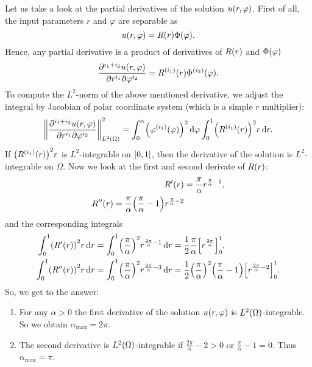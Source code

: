 \documentclass[english]{exercise}
\begin{document}
	Let us take a look at the partial derivatives of the solution \(u\parentheses*{r, \varphi}\).
	First of all, the input parameters \(r\) and \(\varphi\) are separable as
	\[
		u\parentheses*{r, \varphi} = R\parentheses*{r}\Phi\parentheses*{\varphi}.
	\]
	Hence, any partial derivative is a product of derivatives of \(R\parentheses*{r}\) and \(\Phi\parentheses*{\varphi}\)
	\[
		\frac{\partial^{i_1 + i_2}u\parentheses*{r, \varphi}}{\partial r^{i_1}\partial\varphi^{i_2}} = R^{\parentheses*{i_1}}\parentheses*{r}\Phi^{\parentheses*{i_2}}\parentheses*{\varphi}.
	\]
	To compute the \(L^2\)-norm of the above mentioned derivative, we adjust the integral by Jacobian of polar coordinate system (which is a simple \(r\) multiplier):
	\[
		\norm*{\frac{\partial^{i_1 + i_2}u\parentheses*{r, \varphi}}{\partial r^{i_1}\partial\varphi^{i_2}}}_{L^2\parentheses*{\Omega}}^2 = \int_0^\alpha \parentheses*{\varphi^{\parentheses*{i_2}}\parentheses*{\varphi}}^2 \d\varphi \int_0^1 \parentheses*{R^{\parentheses*{i_1}}\parentheses*{r}}^2 r\d r.
	\]
	If \(\parentheses*{R^{\parentheses*{i_1}}\parentheses*{r}}^2 r\) is \(L^2\)-integrable on \(\brackets*{0, 1}\), then the derivative of the solution is \(L^2\)-integrable on \(\Omega\).
	Now we look at the first and second derivate of \(R\parentheses*{r}\):
	\begin{align*}
		R'\parentheses*{r} &= \frac{\pi}{\alpha}r^{\frac{\pi}{\alpha} - 1},\\
		R''\parentheses*{r} = \frac{\pi}{\alpha}\parentheses*{\frac{\pi}{\alpha} - 1}r^{\frac{\pi}{\alpha} - 2}
	\end{align*}
	and the corresponding integrals
	\begin{align*}
		\int_0^1 \parentheses*{R'\parentheses*{r}}^2 r\d r &= \int_0^1 \parentheses*{\frac{\pi}{\alpha}}^2 r^{\frac{2\pi}{\alpha} - 1}\d r = \frac{1}{2}\frac{\pi}{\alpha}\brackets*{r^{\frac{2\pi}{\alpha}}}_0^1,\\
		\int_0^1 \parentheses*{R''\parentheses*{r}}^2 r\d r &= \int_0^1 \parentheses*{\frac{\pi}{\alpha}}^2 r^{\frac{2\pi}{\alpha} - 3}\d r = \frac{1}{2}\parentheses*{\frac{\pi}{\alpha}}^2 \parentheses*{\frac{\pi}{\alpha} - 1}\brackets*{r^{\frac{2\pi}{\alpha} - 2}}_0^1.
	\end{align*}
	So, we get to the answer:
	\begin{enumerate}
		\item For any \(\alpha > 0\) the first derivative of the solution \(u\parentheses*{r, \varphi}\) is \(L^2\parentheses*{\Omega}\)-integrable.
		So we obtain \(\alpha_{\text{max}} = 2\pi\).
		\item The second derivative is \(L^2\parentheses*{\Omega}\)-integrable if \(\frac{2\pi}{\alpha} - 2 > 0\) or \(\frac{\pi}{\alpha} - 1 = 0\).
		Thus \(\alpha_{\text{max}} = \pi\).
	\end{enumerate}
\end{document}
